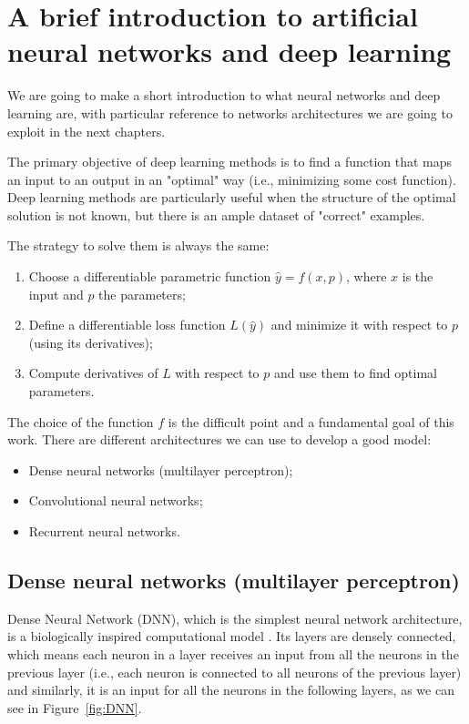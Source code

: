 \section{A brief introduction to artificial neural networks and deep learning}

We are going to make a short introduction to what neural networks and deep learning are, with particular reference to networks architectures we are going to exploit in the next chapters.

The primary objective of deep learning methods is to find a function that maps an input to an output in an "optimal" way (i.e., minimizing some cost function). Deep learning methods are particularly useful when the structure of the optimal solution is not known, but there is an ample dataset of "correct" examples.

The strategy to solve them is always the same: 
\begin{enumerate}
    \item Choose a differentiable parametric function $\hat{y} = f(x,p)$, where $x$ is the input and $p$ the parameters;
    \item Define a differentiable loss function $L(\hat{y})$ and minimize it with respect to $p$ (using its derivatives);
    \item Compute derivatives of $L$ with respect to $p$ and use them to find optimal parameters.
\end{enumerate}

The choice of the function $f$ is the difficult point and a fundamental goal of this work. 
There are different architectures we can use to develop a good model:
\begin{itemize}
    \item Dense neural networks (multilayer perceptron);
    \item Convolutional neural networks;
    \item Recurrent neural networks.
\end{itemize}

\subsection{Dense neural networks (multilayer perceptron)}
Dense Neural Network (DNN), which is the simplest neural network architecture, is a biologically inspired computational model \cite{DNNandCNN}. Its layers are densely connected, which means each neuron in a layer receives an input from all the neurons in the previous layer (i.e., each neuron is connected to all neurons of the previous layer) and similarly, it is an input for all the neurons in the following layers, as we can see in Figure~\ref{fig:DNN}.


